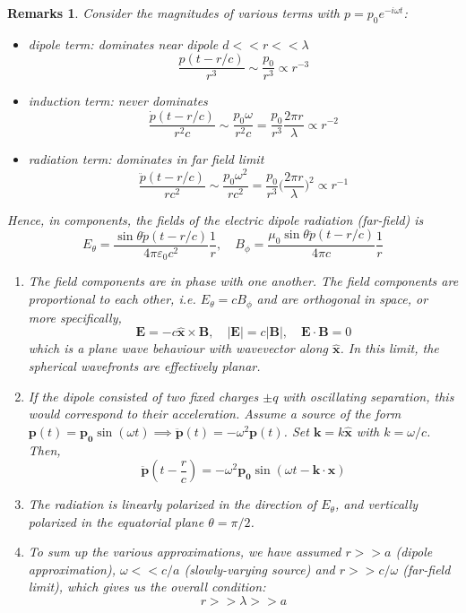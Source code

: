 \documentclass[a4paper]{article}
\newtheorem{remarks}{Remarks}[section]
\theoremstyle{new}
\begin{document}
\begin{remarks}
Consider the magnitudes of various terms with $p=p_0e^{-i\omega t}$:
\begin{itemize}
    \item dipole term: dominates near dipole $d<<r<<\lambda$
    $$\frac{p(t-r/c)}{r^3}\sim\frac{p_0}{r^3}\propto r^{-3}$$
    \item induction term: never dominates
    $$\frac{\dot{p}(t-r/c)}{r^2c}\sim\frac{p_0\omega}{r^2c}=\frac{p_0}{r^3}\frac{2\pi r}{\lambda}\propto r^{-2}$$
    \item radiation term: dominates in far field limit
    $$\frac{\ddot{p}(t-r/c)}{rc^2}\sim\frac{p_0\omega^2}{rc^2}=\frac{p_0}{r^3}\bigg(\frac{2\pi r}{\lambda}\bigg)^2\propto r^{-1}$$
\end{itemize}
Hence, in components, the fields of the electric dipole radiation (far-field) is
$$E_\theta=\frac{\sin\theta\ddot{p}(t-r/c)}{4\pi\varepsilon_0c^2}\frac{1}{r},\quad B_\phi=\frac{\mu_0\sin\theta\ddot{p}(t-r/c)}{4\pi c}\frac{1}{r}$$
\begin{enumerate}
    \item The field components are in phase with one another. The field components are proportional to each other, i.e. $E_\theta=cB_\phi$ and are orthogonal in space, or more specifically,
    $$\mathbf{E}=-c\mathbf{\hat{x}}\times\mathbf{B},\quad |\mathbf{E}|=c|\mathbf{B}|,\quad\mathbf{E}\cdot\mathbf{B}=0$$
    which is a plane wave behaviour with wavevector along $\mathbf{\hat{x}}$. In this limit, the spherical wavefronts are effectively planar.
    \item If the dipole consisted of two fixed charges $\pm q$ with oscillating separation, this would correspond to their acceleration.  Assume a source of the form $\mathbf{p}(t)=\mathbf{p_0}\sin(\omega t)\implies\mathbf{\ddot{p}}(t)=-\omega^2\mathbf{p}(t)$. Set $\mathbf{k}=k\mathbf{\hat{x}}$ with $k=\omega/c$. Then, 
    $$\mathbf{\ddot{p}}(t-\frac{r}{c})=-\omega^2\mathbf{p_0}\sin(\omega t-\mathbf{k}\cdot\mathbf{x})$$
    \item The radiation is linearly polarized in the direction of $E_\theta$, and vertically polarized in the equatorial plane $\theta=\pi/2$.
    \item To sum up the various approximations, we have assumed $r>>a$ (dipole approximation), $\omega<<c/a$ (slowly-varying source) and $r>>c/\omega$ (far-field limit), which gives us the overall condition:
    $$r>>\lambda>>a$$
\end{enumerate}
\end{remarks}
\end{document}
